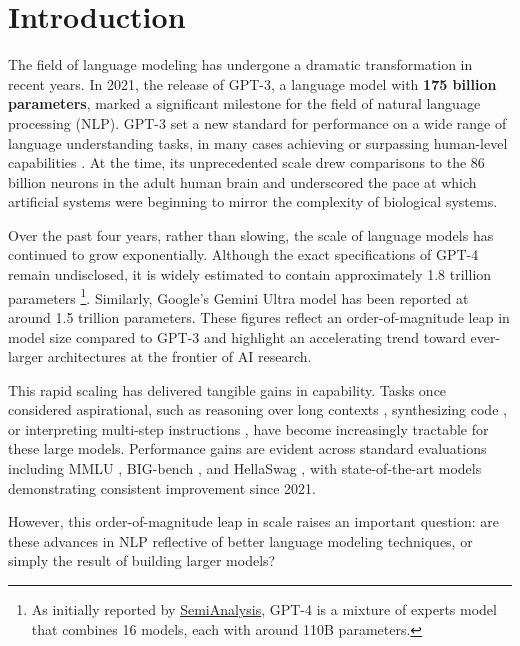 \chapter{Introduction}

The field of language modeling has undergone a dramatic transformation in recent years. In 2021, the release of GPT-3, a language model with \textbf{175 billion parameters}, marked a significant milestone for the field of natural language processing (NLP). GPT-3 set a new standard for performance on a wide range of language understanding tasks, in many cases achieving or surpassing human-level capabilities \citep{brown2020gpt3}. At the time, its unprecedented scale drew comparisons to the 86 billion neurons in the adult human brain \citep{azevedo2009neurons} and underscored the pace at which artificial systems were beginning to mirror the complexity of biological systems.

Over the past four years, rather than slowing, the scale of language models has continued to grow exponentially. Although the exact specifications of GPT-4 remain undisclosed, it is widely estimated to contain approximately 1.8 trillion parameters \footnote{As initially reported by \href{https://semianalysis.com/2023/07/10/gpt-4-architecture-infrastructure/}{SemiAnalysis}, GPT-4 is a mixture of experts model that combines 16 models, each with around 110B parameters.}. Similarly, Google's Gemini Ultra model has been reported at around 1.5 trillion parameters. These figures reflect an order-of-magnitude leap in model size compared to GPT-3 and highlight an accelerating trend toward ever-larger architectures at the frontier of AI research.

This rapid scaling has delivered tangible gains in capability. Tasks once considered aspirational, such as reasoning over long contexts \citep{lewis2020retrieval}, synthesizing code \citep{chen2021evaluating}, or interpreting multi-step instructions \citep{wei2022chain}, have become increasingly tractable for these large models. Performance gains are evident across standard evaluations including MMLU \citep{hendrycks2021mmlu}, BIG-bench \citep{srivastava2023bigbench}, and HellaSwag \citep{zellers2019hellaswag}, with state-of-the-art models demonstrating consistent improvement since 2021.

However, this order-of-magnitude leap in scale raises an important question: are these advances in NLP reflective of better language modeling techniques, or simply the result of building larger models? 

